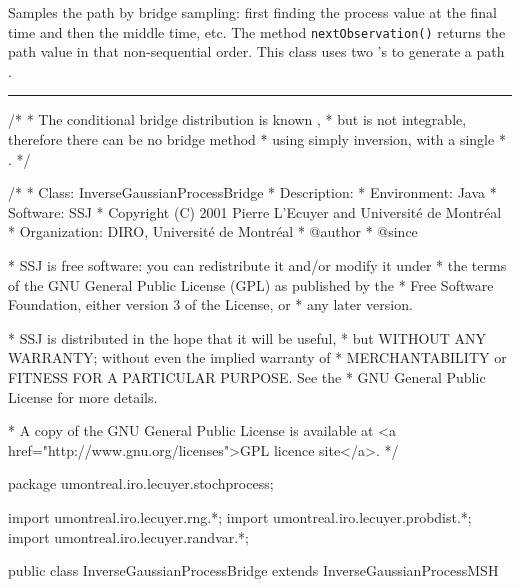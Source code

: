 
Samples the path by bridge sampling: 
first finding the process value at
the final time and then the middle time, etc.
The method \texttt{nextObservation()} returns the path value
in that non-sequential order. 
This class uses two 
's to generate
a path \cite{fWEB03a}.



\bigskip\hrule\bigskip

\begin{code}\begin{hide}
/* 
 * The conditional bridge distribution is known \cite{fWEB03a},
 * but is not integrable, therefore there can be no bridge method
 * using simply inversion, with a single 
 * .
 */

/*
 * Class:        InverseGaussianProcessBridge
 * Description:  
 * Environment:  Java
 * Software:     SSJ 
 * Copyright (C) 2001  Pierre L'Ecuyer and Université de Montréal
 * Organization: DIRO, Université de Montréal
 * @author       
 * @since

 * SSJ is free software: you can redistribute it and/or modify it under
 * the terms of the GNU General Public License (GPL) as published by the
 * Free Software Foundation, either version 3 of the License, or
 * any later version.

 * SSJ is distributed in the hope that it will be useful,
 * but WITHOUT ANY WARRANTY; without even the implied warranty of
 * MERCHANTABILITY or FITNESS FOR A PARTICULAR PURPOSE.  See the
 * GNU General Public License for more details.

 * A copy of the GNU General Public License is available at
   <a href="http://www.gnu.org/licenses">GPL licence site</a>.
 */
\end{hide}
package umontreal.iro.lecuyer.stochprocess;\begin{hide}
import umontreal.iro.lecuyer.rng.*;
import umontreal.iro.lecuyer.probdist.*;
import umontreal.iro.lecuyer.randvar.*;

\end{hide}

public class InverseGaussianProcessBridge extends InverseGaussianProcessMSH \begin{hide} {

    // Careful: mu and lambda are completely different from parent class.
    protected double[] imu2;
    protected double[] imuLambdaZ;
    protected double[] imuOver2LambdaZ;

    protected int[] wIndexList;
    protected int   bridgeCounter = -1; // Before 1st observ

\end{hide}
\end{code}
